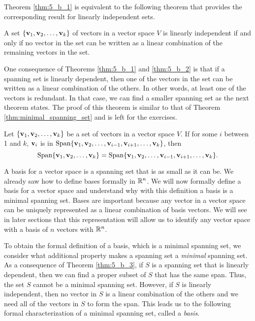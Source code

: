 Theorem \ref{thm:5_b_1} is equivalent to the following theorem that provides the corresponding result for linearly independent sets.  

\begin{theorem} \label{thm:5_b_2} A set $\{\mathbf{v}_1, \mathbf{v}_2, \ldots, \mathbf{v}_k\}$ of vectors in a vector space $V$ is linearly independent if and only if no vector in the set can be written as a linear combination of the remaining vectors in the set.
\end{theorem}


One consequence of Theorems \ref{thm:5_b_1} and \ref{thm:5_b_2} is that if a spanning set is linearly dependent, then one of the vectors in the set can be written as a linear combination of the others. In other words, at least one of the vectors is redundant. In that case, we can find a smaller spanning set as the next theorem states. The proof of this theorem is similar to that of Theorem \ref{thm:minimal_spanning_set} and is left for the exercises. 

\begin{theorem} \label{thm:5_b_3} Let $\{\mathbf{v}_1, \mathbf{v}_2, \ldots, \mathbf{v}_k\}$ be a set of vectors in a vector space $V$. If for some $i$ between 1 and $k$, $\mathbf{v}_i$ is in $\text{Span} \{\mathbf{v}_1, \mathbf{v}_2, \ldots, \mathbf{v}_{i-1}, \mathbf{v}_{i+1}, \ldots, \mathbf{v}_k\}$, then
\[\text{Span}\{\mathbf{v}_1, \mathbf{v}_2, \ldots, \mathbf{v}_k\} = \text{Span}\{\mathbf{v}_1, \mathbf{v}_2, \ldots, \mathbf{v}_{i-1}, \mathbf{v}_{i+1}, \ldots, \mathbf{v}_k\}.\]
\end{theorem}


\label{sec:bases}

A basis for a vector space is a spanning set that is as small as it can be. We already saw how to define bases formally in $\mathbb{R}^n$. We will now formally define a basis for a vector space and understand why with this definition a basis is a minimal spanning set. Bases are important because any vector in a vector space can be uniquely represented as a linear combination of basis vectors. We will see in later sections that this representation will allow us to identify any vector space with a basis of $n$ vectors with $\mathbb{R}^n$. 


To obtain the formal definition of a basis, which is a minimal spanning set, we consider what additional property makes a spanning set a \emph{minimal} spanning set. As a consequence of Theorem \ref{thm:5_b_3}, if $S$ is a spanning set that is linearly dependent, then we can find a proper subset of $S$ that has the same span. Thus, the set $S$ cannot be a minimal spanning set. However, if $S$ is linearly independent, then no vector in $S$ is a linear combination of the others and we need all of the vectors in $S$ to form the span. This leads us to the following formal characterization of a minimal spanning set, called a \emph{basis}.


